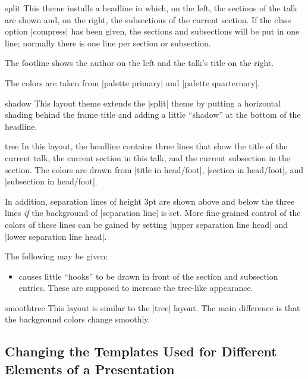 \begin{outerthemeexample}{split}
  This theme installs a headline in which, on the left, the sections of the talk are shown and, on the right, the subsections of the current section. If the class option |compress| has been given, the sections and subsections will be put in one line; normally there is one line per section or subsection.

  The footline shows the author on the left and the talk's title on the right.

  The colors are taken from |palette primary| and |palette quarternary|.
\end{outerthemeexample}

\begin{outerthemeexample}{shadow}
  This layout theme extends the |split| theme by putting a horizontal shading behind the frame title and adding a little ``shadow'' at the bottom of the headline.
\end{outerthemeexample}

\begin{outerthemeexample}{tree}
  In this layout, the headline contains three lines that show the title of the current talk, the current section in this talk, and the current subsection in the section. The colors are drawn from |title in head/foot|, |section in head/foot|, and |subsection in head/foot|.

  In addition, separation lines of height 3pt are shown above and below the three lines \emph{if} the background of |separation line| is set. More fine-grained control of the colors of these lines can be gained by setting |upper separation line head| and |lower separation line head|.

  The following  may be given:
  \begin{itemize}
  \item
     causes little ``hooks'' to be drawn in front of the section and subsection entries. These are supposed to increase the tree-like appearance.
  \end{itemize}
\end{outerthemeexample}

\begin{outerthemeexample}{smoothtree}
  This layout is similar to the |tree| layout. The main difference is that the background colors change smoothly.
\end{outerthemeexample}


\subsection{Changing the Templates Used for Different Elements of a Presentation}
\label{section-templates}

